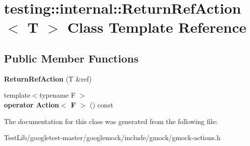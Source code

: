 \hypertarget{classtesting_1_1internal_1_1ReturnRefAction}{}\section{testing\+:\+:internal\+:\+:Return\+Ref\+Action$<$ T $>$ Class Template Reference}
\label{classtesting_1_1internal_1_1ReturnRefAction}
\subsection*{Public Member Functions}
\begin{DoxyCompactItemize}
\item 
\mbox{\label{classtesting_1_1internal_1_1ReturnRefAction_a1384b1cd78f3069f0493e2302f143701}} 
{\bfseries Return\+Ref\+Action} (T \&ref)
\item 
\mbox{\label{classtesting_1_1internal_1_1ReturnRefAction_a48e5d411097707e558af62eb68edc162}} 
{\footnotesize template$<$typename F $>$ }\\{\bfseries operator Action$<$ F $>$} () const
\end{DoxyCompactItemize}


The documentation for this class was generated from the following file\+:\begin{DoxyCompactItemize}
\item 
Test\+Lib/googletest-\/master/googlemock/include/gmock/gmock-\/actions.\+h\end{DoxyCompactItemize}
